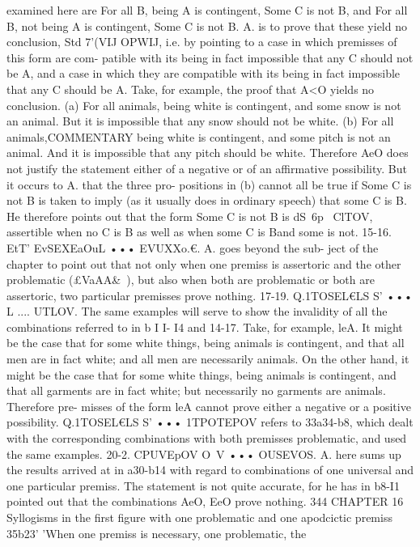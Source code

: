 {{{{{examined here are For all B, being A is contingent, Some C is
not B, and For all B, not being A is contingent, Some C is not
B. A. is to prove that these yield no conclusion, Std 7'(VIJ OPWIJ, i.e.
by pointing to a case in which premisses of this form are com-
patible with its being in fact impossible that any C should not
be A, and a case in which they are compatible with its being
in fact impossible that any C should be A. Take, for example, the
proof that A<O yields no conclusion. (a) For all animals, being
white is contingent, and some snow is not an animal. But it is
impossible that any snow should not be white. (b) For all animals,COMMENTARY
being white is contingent, and some pitch is not an animal.
And it is impossible that any pitch should be white. Therefore
AeO does not justify the statement either of a negative or of an
affirmative possibility. But it occurs to A. that the three pro-
positions in (b) cannot all be true if Some C is not B is taken to
imply (as it usually does in ordinary speech) that some C is B.
He therefore points out that the form Some C is not B is dS~6p~­
ClTOV, assertible when no C is B as well as when some C is Band
some is not.
15-16. EtT' EvSEXEaOuL ••• EVUXXo.€. A. goes beyond the sub-
ject of the chapter to point out that not only when one premiss
is assertoric and the other problematic (£VaAA&~), but also when
both are problematic or both are assertoric, two particular
premisses prove nothing.
17-19. Q.1TOSEL€LS S' ••• L .... UTLOV. The same examples will
serve to show the invalidity of all the combinations referred to in
b I I- I4 and 14-17. Take, for example, leA. It might be the case
that for some white things, being animals is contingent, and that
all men are in fact white; and all men are necessarily animals. On
the other hand, it might be the case that for some white things,
being animals is contingent, and that all garments are in fact
white; but necessarily no garments are animals. Therefore pre-
misses of the form leA cannot prove either a negative or a positive
possibility.
Q.1TOSEL€LS S' ••• 1TPOTEPOV refers to 33a34-b8, which dealt with
the corresponding combinations with both premisses problematic,
and used the same examples.
20-2. CPUVEpOV O~V ••• OUSEVOS. A. here sums up the results
arrived at in a30-b14 with regard to combinations of one universal
and one particular premiss. The statement is not quite accurate,
for he has in b8-I1 pointed out that the combinations AeO, EeO
prove nothing.
344
CHAPTER 16
Syllogisms in the first figure with one problematic and one apodcictic
premiss
35b23' 'When one premiss is necessary, one problematic, the
}}}}}

